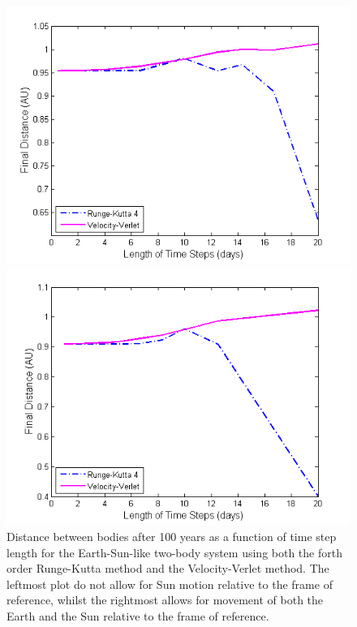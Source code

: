 \begin{figure}[H]
\centering
\begin{minipage}{.5\textwidth}
  \centering
  \includegraphics[width=1\linewidth]{Figures/Test_2body_system_earth.png}
\end{minipage}%
\begin{minipage}{.5\textwidth}
  \centering
  \includegraphics[width=1\linewidth]{Figures/Test_2body_system_earth_sun.png}
\end{minipage}
\caption{
Distance between bodies after 100 years as a function of time step length for the Earth-Sun-like two-body system using both the forth order Runge-Kutta method and the Velocity-Verlet method. 
The leftmost plot do not allow for Sun motion relative to the frame of reference, whilst the rightmost allows for movement of both the Earth and the Sun relative to the frame of reference.
}
\label{fig:SunEarthMarsTest}
\end{figure}

